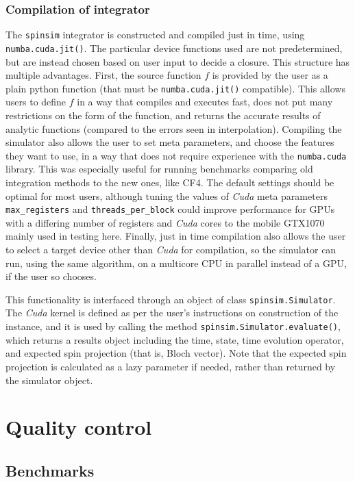 \documentclass{jors}
\begin{document}
		\subsubsection*{Compilation of integrator}
			The \texttt{spinsim} integrator is constructed and compiled just in time, using \texttt{numba.cuda.jit()}. The particular device functions used are not predetermined, but are instead chosen based on user input to decide a closure. This structure has multiple advantages. First, the source function \(f\) is provided by the user as a plain python function (that must be \texttt{numba.cuda.jit()} compatible). This allows users to define \(f\) in a way that compiles and executes fast, does not put many restrictions on the form of the function, and returns the accurate results of analytic functions (compared to the errors seen in interpolation). Compiling the simulator also allows the user to set meta parameters, and choose the features they want to use, in a way that does not require experience with the \texttt{numba.cuda} library. This was especially useful for running benchmarks comparing old integration methods to the new ones, like CF4. The default settings should be optimal for most users, although tuning the values of \emph{Cuda} meta parameters \texttt{max\_registers} and \texttt{threads\_per\_block} could improve performance for GPUs with a differing number of registers and \emph{Cuda} cores to the mobile GTX1070 mainly used in testing here. Finally, just in time compilation also allows the user to select a target device other than \emph{Cuda} for compilation, so the simulator can run, using the same algorithm, on a multicore CPU in parallel instead of a GPU, if the user so chooses.
			
			This functionality is interfaced through an object of class \texttt{spinsim.Simulator}. The \emph{Cuda} kernel is defined as per the user’s instructions on construction of the instance, and it is used by calling the method \texttt{spinsim.Simulator.evaluate()}, which returns a results object including the time, state, time evolution operator, and expected spin projection (that is, Bloch vector). Note that the expected spin projection is calculated as a lazy parameter if needed, rather than returned by the simulator object.

\section*{Quality control}
	\subsection*{Benchmarks}
\end{document}
